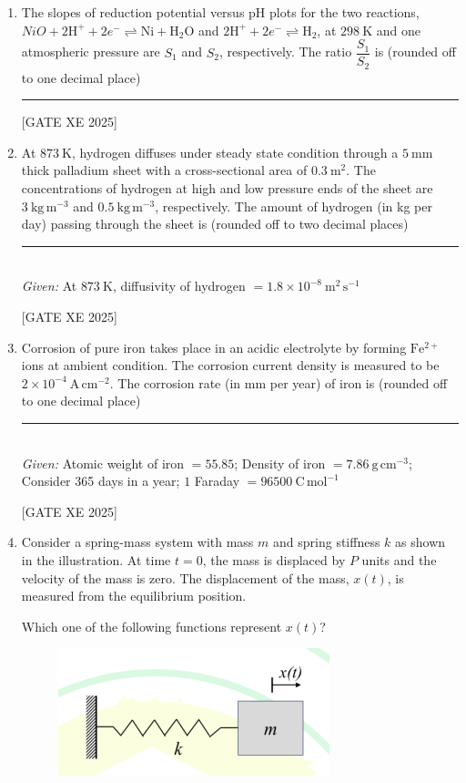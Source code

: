 \documentclass[journal,12pt,onecolumn]{IEEEtran}
\theoremstyle{remark}
\begin{document}
\begin{enumerate}
\hfill[GATE XE 2025]

\item The slopes of reduction potential versus pH plots for the two reactions, ${NiO} + 2\mathrm{H}^+ + 2e^- \rightleftharpoons \mathrm{Ni} + \mathrm{H_2O}$ and $2\mathrm{H}^+ + 2e^- \rightleftharpoons \mathrm{H_2}$, at $298~\mathrm{K}$ and one atmospheric pressure are $S_1$ and $S_2$, respectively. The ratio $\dfrac{S_1}{S_2}$ is (rounded off to one decimal place) \rule{3cm}{0.15mm}

\hfill[GATE XE 2025]

\item At $873~\mathrm{K}$, hydrogen diffuses under steady state condition through a $5~\mathrm{mm}$ thick palladium sheet with a cross-sectional area of $0.3~\mathrm{m^2}$. The concentrations of hydrogen at high and low pressure ends of the sheet are $3~\mathrm{kg\, m^{-3}}$ and $0.5~\mathrm{kg\, m^{-3}}$, respectively. The amount of hydrogen (in kg per day) passing through the sheet is (rounded off to two decimal places) \rule{3cm}{0.15mm} \\
\textit{Given:} At $873~\mathrm{K}$, diffusivity of hydrogen $= 1.8 \times 10^{-8}~\mathrm{m^2\, s^{-1}}$

\hfill[GATE XE 2025]

\item Corrosion of pure iron takes place in an acidic electrolyte by forming $\mathrm{Fe^{2+}}$ ions at ambient condition. The corrosion current density is measured to be $2 \times 10^{-4}~\mathrm{A\, cm^{-2}}$. The corrosion rate (in mm per year) of iron is (rounded off to one decimal place) \rule{3cm}{0.15mm} \\
\textit{Given:} Atomic weight of iron $= 55.85$; Density of iron $= 7.86~\mathrm{g\, cm^{-3}}$; Consider 365 days in a year; $1$ Faraday $= 96500~\mathrm{C\, mol^{-1}}$

\hfill[GATE XE 2025]

\item Consider a spring-mass system with mass $m$ and spring stiffness $k$ as shown in the illustration. At time $t=0$, the mass is displaced by $P$ units and the velocity of the mass is zero. The displacement of the mass, $x(t)$, is measured from the equilibrium position.

Which one of the following functions represent $x(t)$?

\begin{figure}[H]
    \centering
    \includegraphics[width=0.5\columnwidth]{figs/fig15.png}
    \caption{}
    \label{fig:placeholder}
\end{figure}


\end{enumerate}
\end{document}
